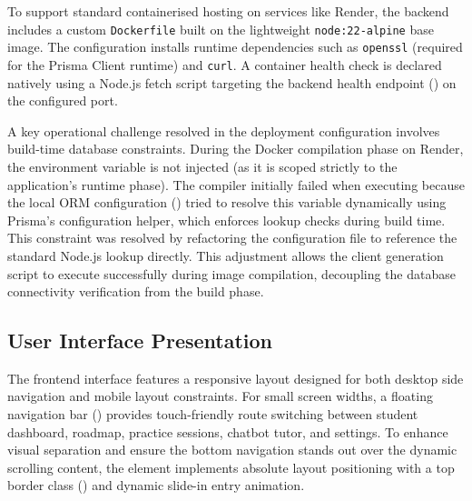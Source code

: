 \begin{sloppypar}
To support standard containerised hosting on services like Render, the backend includes a custom \texttt{Dockerfile} built on the lightweight \texttt{node:22-alpine} base image. The configuration installs runtime dependencies such as \texttt{openssl} (required for the Prisma Client runtime) and \texttt{curl}. A container health check is declared natively using a Node.js fetch script targeting the backend health endpoint () on the configured port.

A key operational challenge resolved in the deployment configuration involves build-time database constraints. During the Docker compilation phase on Render, the  environment variable is not injected (as it is scoped strictly to the application's runtime phase). The compiler initially failed when executing  because the local ORM configuration () tried to resolve this variable dynamically using Prisma's  configuration helper, which enforces lookup checks during build time. This constraint was resolved by refactoring the configuration file to reference the standard Node.js  lookup directly. This adjustment allows the client generation script to execute successfully during image compilation, decoupling the database connectivity verification from the build phase.
\end{sloppypar}

\subsection{User Interface Presentation}

The frontend interface features a responsive layout designed for both desktop side navigation and mobile layout constraints. For small screen widths, a floating navigation bar () provides touch-friendly route switching between student dashboard, roadmap, practice sessions, chatbot tutor, and settings. To enhance visual separation and ensure the bottom navigation stands out over the dynamic scrolling content, the element implements absolute layout positioning with a top border class () and dynamic slide-in entry animation.
